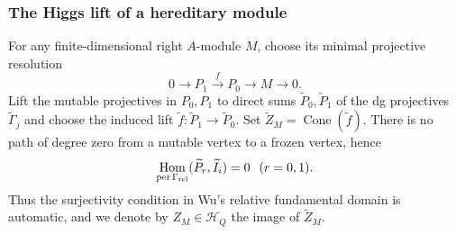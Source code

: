 \documentclass[11pt,reqno]{article}
\numberwithin{equation}{section}
\theoremstyle{definition}
\DeclareMathOperator{\Hom}{Hom}
\begin{document}
\subsubsection{The Higgs lift of a hereditary module}
For any finite-dimensional right $A$-module $M$, choose its minimal projective resolution
\begin{equation}\label{eq:principal-projres}
 0\longrightarrow P_1\xrightarrow{f}P_0\longrightarrow M\longrightarrow0.
\end{equation}
Lift the mutable projectives in $P_0,P_1$ to direct sums $\widetilde P_0,\widetilde P_1$ of the dg projectives $\widetilde\Gamma_j$ and choose the induced lift $\widetilde f\colon\widetilde P_1\to\widetilde P_0$.  Set $\widetilde Z_M=\operatorname{Cone}(\widetilde f)$.  There is no path of degree zero from a mutable vertex to a frozen vertex, hence
\[
 \Hom_{\operatorname{per}\Gamma_{\mathrm{rel}}}(\widetilde P_r,\widetilde I_i)=0
  \hspace{2.5mm}(r=0,1).
\]
Thus the surjectivity condition in Wu's relative fundamental domain is automatic, and we denote by $Z_M\in\mathcal H_Q$ the image of $\widetilde Z_M$.
\end{document}
